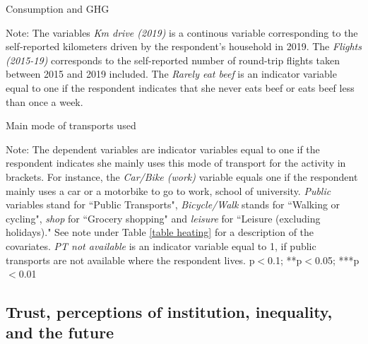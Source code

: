 \documentclass{article}
\begin{document}
\begin{table}[h!]
	\caption{Consumption and GHG}
	\begin{center}
		\scalebox{0.7}{}
	\end{center}
	{\footnotesize Note: The variables \textit{Km drive (2019)} is a continous variable corresponding to the self-reported kilometers driven by the respondent's household in 2019. The \textit{Flights (2015-19)} corresponds to the self-reported number of round-trip flights taken between 2015 and 2019 included. The \textit{Rarely eat beef} is an indicator variable equal to one if the respondent indicates that she never eats beef or eats beef less than once a week.}
\end{table}	

\begin{landscape}
\begin{table}[h!]
	\caption{Main mode of transports used}
	\begin{center}
		\scalebox{0.6}{}
	\end{center}
	{\footnotesize Note: The dependent variables are indicator variables equal to one if the respondent indicates she mainly uses this mode of transport for the activity in brackets. For instance, the \textit{Car/Bike (work)} variable equals one if the respondent mainly uses a car or a motorbike to go to work, school of university. \textit{Public} variables stand for ``Public Transports", \textit{Bicycle/Walk} stands for ``Walking or cycling", \textit{shop} for ``Grocery shopping" and \textit{leisure} for ``Leisure (excluding holidays)."
	See note under Table \ref{table heating} for a description of the covariates. \textit{PT not available} is an indicator variable equal to 1, if public transports are not available where the respondent lives.
	\newline *p$<$0.1; **p$<$0.05; ***p$<$0.01}	
\end{table}	
\end{landscape}

\clearpage
\subsection{Trust, perceptions of institution, inequality, and the future}
\end{document}
